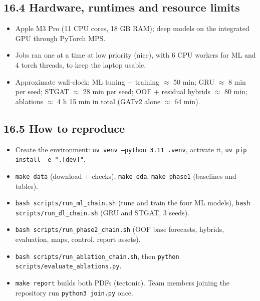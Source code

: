 \documentclass[10pt,a4paper]{article}
\begin{document}
\subsection*{16.4 Hardware, runtimes and resource limits}
\begin{itemize}[nosep,leftmargin=*]
\item Apple M3 Pro (11 CPU cores, 18 GB RAM); deep models on the integrated GPU through PyTorch MPS.
\item Jobs ran one at a time at low priority (nice), with 6 CPU workers for ML and 4 torch threads, to keep the laptop usable.
\item Approximate wall-clock: ML tuning + training \ensuremath{\approx} 50 min; GRU \ensuremath{\approx} 8 min per seed; STGAT \ensuremath{\approx} 28 min per seed; OOF + residual hybrids \ensuremath{\approx} 80 min; ablations \ensuremath{\approx} 4 h 15 min in total (GATv2 alone \ensuremath{\approx} 64 min).
\end{itemize}

\subsection*{16.5 How to reproduce}
\begin{itemize}[nosep,leftmargin=*]
\item Create the environment: \texttt{uv venv --python 3.11 .venv}, activate it, \texttt{uv pip install -e ".[dev]"}.
\item \texttt{make data} (download + checks), \texttt{make eda}, \texttt{make phase1} (baselines and tables).
\item \texttt{bash scripts/\allowbreak{}run\_\allowbreak{}ml\_\allowbreak{}chain.sh} (tune and train the four ML models), \texttt{bash scripts/\allowbreak{}run\_\allowbreak{}dl\_\allowbreak{}chain.sh} (GRU and STGAT, 3 seeds).
\item \texttt{bash scripts/\allowbreak{}run\_\allowbreak{}phase2\_\allowbreak{}chain.sh} (OOF base forecasts, hybrids, evaluation, maps, control, report assets).
\item \texttt{bash scripts/\allowbreak{}run\_\allowbreak{}ablation\_\allowbreak{}chain.sh}, then \texttt{python scripts/\allowbreak{}evaluate\_\allowbreak{}ablations.py}.
\item \texttt{make report} builds both PDFs (tectonic). Team members joining the repository run \texttt{python3 join.py} once.
\end{itemize}
\end{document}
